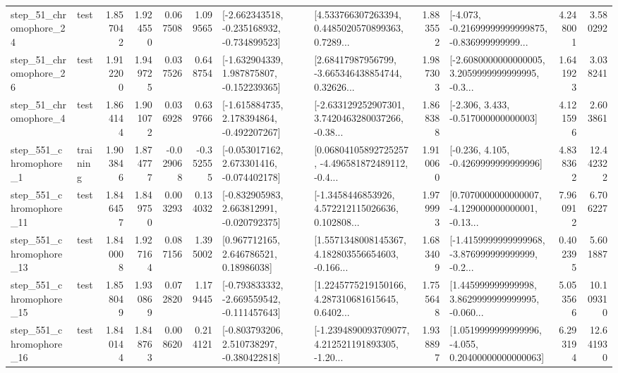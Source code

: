 \begin{tabular}{llrrrrllrlrr}
   step\_51\_chromophore\_24 &      test &      1.857042 &    1.924550 &      0.067508 &  1.099565 &  [-2.662343518, -0.235168932, -0.734899523] &  [4.533766307263394, 0.4485020570899363, 0.7289... &       1.883552 &  [-4.073, -0.21699999999999875, -0.836999999999... &            4.248001 &          3.580292 \\
   step\_51\_chromophore\_26 &      test &      1.912200 &    1.949725 &      0.037526 &  0.648754 &   [-1.632904339, 1.987875807, -0.152239365] &  [2.68417987956799, -3.665346438854744, 0.32626... &       1.987303 &  [-2.6080000000000005, 3.2059999999999995, -0.3... &            1.641923 &          3.038241 \\
    step\_51\_chromophore\_4 &      test &      1.864144 &    1.901072 &      0.036928 &  0.639766 &   [-1.615884735, 2.178394864, -0.492207267] &  [-2.633129252907301, 3.7420463280037266, -0.38... &       1.868388 &                [-2.306, 3.433, -0.517000000000003] &            4.121596 &          2.603861 \\
   step\_551\_chromophore\_1 &  training &      1.903846 &    1.874777 &     -0.029068 & -0.352555 &   [-0.053017162, 2.673301416, -0.074402178] &  [0.06804105892725257, -4.496581872489112, -0.4... &       1.910060 &               [-0.236, 4.105, -0.4269999999999996] &            4.838362 &         12.442322 \\
  step\_551\_chromophore\_11 &      test &      1.846457 &    1.849750 &      0.003293 &  0.134032 &   [-0.832905983, 2.663812991, -0.020792375] &  [-1.3458446853926, 4.572212115026636, 0.102808... &       1.979993 &  [0.7070000000000007, -4.129000000000001, -0.13... &            7.960912 &          6.706227 \\
  step\_551\_chromophore\_13 &      test &      1.840008 &    1.927164 &      0.087156 &  1.395002 &      [0.967712165, 2.646786521, 0.18986038] &  [1.5571348008145367, 4.182803556654603, -0.166... &       1.683409 &  [-1.4159999999999968, -3.876999999999999, -0.2... &            0.402395 &          5.601887 \\
  step\_551\_chromophore\_15 &      test &      1.858049 &    1.930869 &      0.072820 &  1.179445 &  [-0.793833332, -2.669559542, -0.111457643] &  [1.2245775219150166, 4.287310681615645, 0.6402... &       1.755648 &  [1.445999999999998, 3.8629999999999995, -0.060... &            5.053566 &         10.109310 \\
  step\_551\_chromophore\_16 &      test &      1.840144 &    1.848763 &      0.008620 &  0.214121 &   [-0.803793206, 2.510738297, -0.380422818] &  [-1.2394890093709077, 4.212521191893305, -1.20... &       1.938897 &  [1.0519999999999996, -4.055, 0.20400000000000063] &            6.293194 &         12.641930 \\

\end{tabular}
